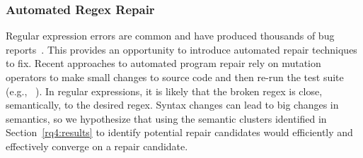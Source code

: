 
\subsubsection{Automated Regex Repair}
Regular expression errors are common and have produced thousands of bug reports~\cite{Spishak:2012:TSR:2318202.2318207}. This provides an opportunity to introduce automated repair techniques to fix.
Recent approaches to automated program repair rely on mutation operators to make small changes to source code and then re-run the test suite (e.g., ~\cite{cacm10, genprog-tse-journal}). In regular expressions, it is likely that the broken regex is close, semantically, to the desired regex. Syntax changes can lead to big changes in semantics, so we hypothesize that using the semantic clusters identified in Section~\ref{rq4:results} to identify potential repair candidates would efficiently and effectively converge on a repair candidate.





